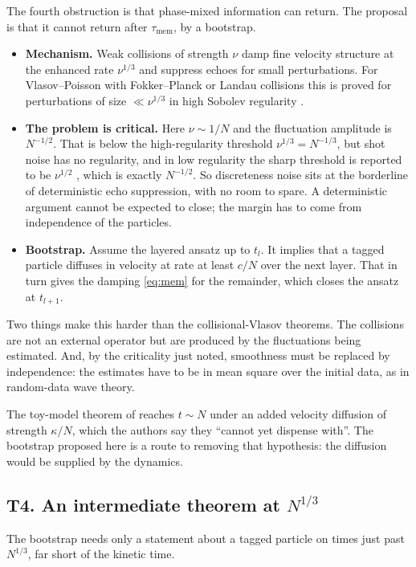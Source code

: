 \documentclass[11pt]{article}
\theoremstyle{definition}
\begin{document}
The fourth obstruction is that phase-mixed information can return. The
proposal is that it cannot return after $\tau_{\mathrm{mem}}$, by a bootstrap.
\begin{itemize}
  \item \textbf{Mechanism.} Weak collisions of strength $\nu$ damp fine
    velocity structure at the enhanced rate $\nu^{1/3}$ and suppress echoes
    for small perturbations. For Vlasov--Poisson with Fokker--Planck or
    Landau collisions this is proved for perturbations of size
    $\ll\nu^{1/3}$ in high Sobolev regularity
    \cite{Bedrossian17,CLN}.
  \item \textbf{The problem is critical.} Here $\nu\sim 1/N$ and the
    fluctuation amplitude is $N^{-1/2}$. That is below the high-regularity
    threshold $\nu^{1/3} = N^{-1/3}$, but shot noise has no regularity, and
    in low regularity the sharp threshold is reported to be $\nu^{1/2}$
    \cite{ZhaoZi}, which is exactly $N^{-1/2}$. So discreteness noise sits
    at the borderline of deterministic echo suppression, with no room to
    spare. A deterministic argument cannot be expected to close; the margin
    has to come from independence of the particles.
  \item \textbf{Bootstrap.} Assume the layered ansatz up to $t_l$. It
    implies that a tagged particle diffuses in velocity at rate at least
    $c/N$ over the next layer. That in turn gives the damping
    \eqref{eq:mem} for the remainder, which closes the ansatz at $t_{l+1}$.
\end{itemize}
Two things make this harder than the collisional-Vlasov theorems. The
collisions are not an external operator but are produced by the fluctuations
being estimated. And, by the criticality just noted, smoothness must be
replaced by independence: the estimates have to be in mean square over the
initial data, as in random-data wave theory.

The toy-model theorem of \cite{DuerinckxLeBihan} reaches $t\sim N$ under an
added velocity diffusion of strength $\kappa/N$, which the authors say they
``cannot yet dispense with''. The bootstrap proposed here is a route to
removing that hypothesis: the diffusion would be supplied by the dynamics.

\subsection{T4. An intermediate theorem at $N^{1/3}$}

The bootstrap needs only a statement about a tagged particle on times just
past $N^{1/3}$, far short of the kinetic time.
\end{document}
